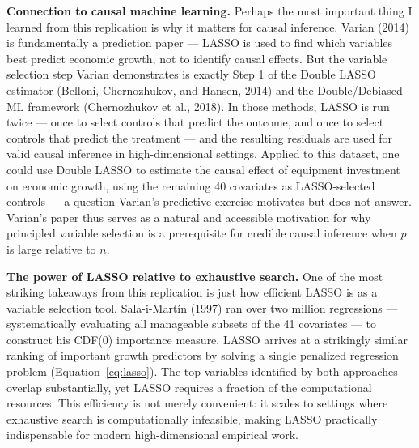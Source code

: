 \documentclass[12pt]{article}
\begin{document}
\textbf{Connection to causal machine learning.} Perhaps the most important
thing I learned from this replication is why it matters for causal inference.
Varian (2014) is fundamentally a prediction paper --- LASSO is used to find
which variables best predict economic growth, not to identify causal effects.
But the variable selection step Varian demonstrates is exactly Step 1 of the
Double LASSO estimator (Belloni, Chernozhukov, and Hansen, 2014) and the
Double/Debiased ML framework (Chernozhukov et al., 2018). In those methods,
LASSO is run twice --- once to select controls that predict the outcome, and
once to select controls that predict the treatment --- and the resulting
residuals are used for valid causal inference in high-dimensional settings.
Applied to this dataset, one could use Double LASSO to estimate the causal
effect of equipment investment on economic growth, using the remaining 40
covariates as LASSO-selected controls --- a question Varian's predictive
exercise motivates but does not answer. Varian's paper thus serves as a natural
and accessible motivation for why principled variable selection is a prerequisite
for credible causal inference when $p$ is large relative to $n$.

\textbf{The power of LASSO relative to exhaustive search.} One of the most
striking takeaways from this replication is just how efficient LASSO is as a
variable selection tool. Sala-i-Mart\'{i}n (1997) ran over two million
regressions --- systematically evaluating all manageable subsets of the 41
covariates --- to construct his CDF(0) importance measure. LASSO arrives at
a strikingly similar ranking of important growth predictors by solving a single
penalized regression problem (Equation~\ref{eq:lasso}). The top variables
identified by both approaches overlap substantially, yet LASSO requires a
fraction of the computational resources. This efficiency is not merely
convenient: it scales to settings where exhaustive search is computationally
infeasible, making LASSO practically indispensable for modern high-dimensional
empirical work.
\end{document}
